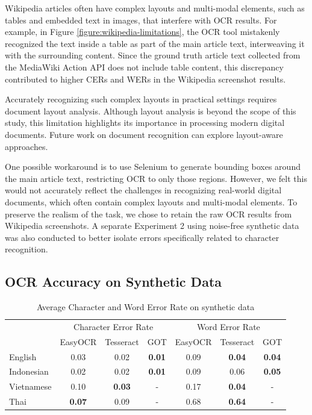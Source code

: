\documentclass[12pt,oneside]{memoir}
\begin{document}
Wikipedia articles often have complex layouts and multi-modal elements, such as tables and embedded text in images, that interfere with OCR results.
For example, in Figure \ref{figure:wikipedia-limitations}, the OCR tool mistakenly recognized the text inside a table as part of the main article text, interweaving it with the surrounding content.
Since the ground truth article text collected from the MediaWiki Action API does not include table content, this discrepancy contributed to higher CERs and WERs in the Wikipedia screenshot results.

Accurately recognizing such complex layouts in practical settings requires document layout analysis.
Although layout analysis is beyond the scope of this study, this limitation highlights its importance in processing modern digital documents.
Future work on document recognition can explore layout-aware approaches.

One possible workaround is to use Selenium to generate bounding boxes around the main article text, restricting OCR to only those regions.
However, we felt this would not accurately reflect the challenges in recognizing real-world digital documents, which often contain complex layouts and multi-modal elements.
To preserve the realism of the task, we chose to retain the raw OCR results from Wikipedia screenshots. 
A separate Experiment 2 using noise-free synthetic data was also conducted to better isolate errors specifically related to character recognition.

\subsection{OCR Accuracy on Synthetic Data} \label{section:ocr-accuracy-on-synthetic-data}

\begin{table}[ht]
    \centering
    \caption{Average Character and Word Error Rate on synthetic data}
    \label{table:ocr-accuracy-on-synthetic-data}
    \begin{tabular}{lcccccc}
        \toprule
        & \multicolumn{3}{c}{Character Error Rate} & \multicolumn{3}{c}{Word Error Rate}\\
        \cmidrule(lr){2-4}\cmidrule(lr){5-7}
        & EasyOCR & Tesseract & GOT & EasyOCR & Tesseract & GOT\\
        \midrule
        English & 0.03 & 0.02 & \textbf{0.01} & 0.09 & \textbf{0.04} & \textbf{0.04}\\
        Indonesian & 0.02 & 0.02 & \textbf{0.01} & 0.09 & 0.06 & \textbf{0.05}\\
        Vietnamese & 0.10 & \textbf{0.03} & - & 0.17 & \textbf{0.04} & -\\
        Thai & \textbf{0.07} & 0.09 & - & 0.68 & \textbf{0.64} & -\\
        \bottomrule
    \end{tabular}
\end{table}
\end{document}

